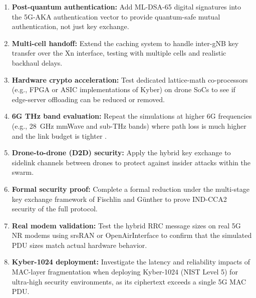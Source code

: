 \documentclass{ieeeaccess}
\begin{document}
\begin{enumerate}
\item \textbf{Post-quantum authentication:} Add ML-DSA-65 digital signatures into the 5G-AKA authentication vector \cite{ref16} to provide quantum-safe mutual authentication, not just key exchange.
\item \textbf{Multi-cell handoff:} Extend the caching system to handle inter-gNB key transfer over the Xn interface, testing with multiple cells and realistic backhaul delays.
\item \textbf{Hardware crypto acceleration:} Test dedicated lattice-math co-processors (e.g., FPGA or ASIC implementations of Kyber) on drone SoCs to see if edge-server offloading can be reduced or removed.
\item \textbf{6G THz band evaluation:} Repeat the simulations at higher 6G frequencies (e.g., 28~GHz mmWave and sub-THz bands) where path loss is much higher and the link budget is tighter \cite{ref21}.
\item \textbf{Drone-to-drone (D2D) security:} Apply the hybrid key exchange to sidelink channels between drones to protect against insider attacks within the swarm.
\item \textbf{Formal security proof:} Complete a formal reduction under the multi-stage key exchange framework of Fischlin and G\"{u}nther \cite{ref30} to prove IND-CCA2 security of the full protocol.
\item \textbf{Real modem validation:} Test the hybrid RRC message sizes on real 5G NR modems using srsRAN or OpenAirInterface to confirm that the simulated PDU sizes match actual hardware behavior.
\item \textbf{Kyber-1024 deployment:} Investigate the latency and reliability impacts of MAC-layer fragmentation when deploying Kyber-1024 (NIST Level 5) for ultra-high security environments, as its ciphertext exceeds a single 5G MAC PDU.
\end{enumerate}
\end{document}
